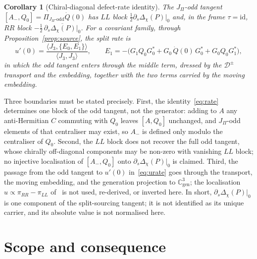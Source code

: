 \documentclass[11pt]{article}
\newtheorem{corollary}{Corollary}
\theoremstyle{definition}
\theoremstyle{remark}
\newcommand{\JPi}{J_{\Pi}}
\newcommand{\Jthree}{J_{3}}
\newcommand{\Cgen}{\mathbb{C}^{3}_{\mathrm{gen}}}
\newcommand{\Dchi}{\Delta_{\chi}}
\newcommand{\Deff}{\mathcal{D}}
\newcommand{\Podd}{\Pi_{\JPi\text{-odd}}}
\begin{document}
    \begin{corollary}[Chiral-diagonal defect-rate identity]
      \label{cor:identification}
      The $\JPi$-odd tangent $[A_-, Q_0] = \Podd \dot Q(0)$ has $LL$ block $\tfrac12 \partial_s \Dchi(P)|_0$ and, in the
      frame $\tau = \mathrm{id}$, $RR$ block $-\tfrac12\,\overline{\partial_s \Dchi(P)|_0}$.
      For a covariant family, through Proposition~\ref{prop:source}, the split rate is
      \begin{equation}
        \label{eq:urate}
        u'(0) = \frac{\langle \Jthree, \{E_0, E_1\}\rangle}{\langle \Jthree, \Jthree\rangle},
        \qquad E_1 = -\bigl(G_1 Q_0 G_0^{*} + G_0\,\dot Q(0)\,G_0^{*} + G_0 Q_0 G_1^{*}\bigr),
      \end{equation}
      in which the odd tangent enters through the middle term, dressed by the $\Deff^{\pm}$ transport and the embedding,
      together with the two terms carried by the moving embedding.
    \end{corollary}

    Three boundaries must be stated precisely.
    First, the identity~\eqref{eq:rate} determines one block of the odd tangent, not the generator: adding to $A$ any
    anti-Hermitian $C$ commuting with $Q_0$ leaves $[A, Q_0]$ unchanged, and $\JPi$-odd elements of that centraliser may
    exist, so $A_-$ is defined only modulo the centraliser of $Q_0$.
    Second, the $LL$ block does not recover the full odd tangent, whose chirally off-diagonal components may be non-zero
    with vanishing $LL$ block; no injective localisation of $[A_-, Q_0]$ onto $\partial_s \Dchi(P)|_0$ is claimed.
    Third, the passage from the odd tangent to $u'(0)$ in~\eqref{eq:urate} goes through the transport, the moving
    embedding, and the generation projection to $\Cgen$; the localisation $u \propto \pi_{RR} - \pi_{LL}$
    of~\cite{Beau2026prs} is not used, re-derived, or inverted here.
    In short, $\partial_s \Dchi(P)|_0$ is one component of the split-sourcing tangent; it is not identified as its
    unique
    carrier, and its absolute value is not normalised here.

  \section{Scope and consequence}
    \label{sec:scope}
\end{document}
